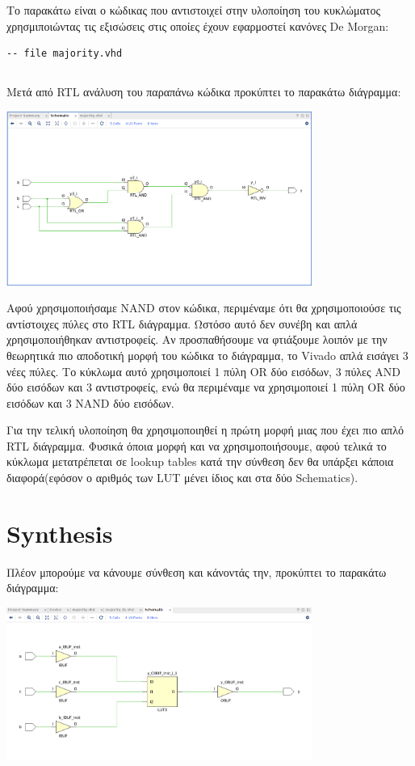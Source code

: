 \documentclass[]{article}
\begin{document}
Το παρακάτω είναι ο κώδικας που αντιστοιχεί στην υλοποίηση του κυκλώματος χρησμιποιώντας τις εξισώσεις στις οποίες έχουν εφαρμοστεί κανόνες De Morgan:
\begin{verbatim}
-- file majority.vhd
\end{verbatim}
\inputminted{vhdl}{./assign_1/majority.vhdl}

Μετά από RTL ανάλυση του παραπάνω κώδικα προκύπτει το παρακάτω διάγραμμα:
\begin{center}
	\includegraphics[width=10cm]{rtl_new.png}
\end{center}

Αφού χρησιμοποιήσαμε NAND στον κώδικα, περιμέναμε ότι θα χρησιμοποιούσε τις αντίστοιχες πύλες στο RTL διάγραμμα.
Ωστόσο αυτό δεν συνέβη και απλά χρησιμοποιήθηκαν αντιστροφείς. Αν προσπαθήσουμε να φτιάξουμε λοιπόν με την θεωρητικά
πιο αποδοτική μορφή του κώδικα το διάγραμμα, το Vivado απλά εισάγει 3 νέες πύλες. Το κύκλωμα αυτό χρησιμοποιεί 1 πύλη OR δύο εισόδων, 3 πύλες AND δύο εισόδων και 3 αντιστροφείς,
ενώ θα περιμέναμε να χρησιμοποιεί 1 πύλη OR δύο εισόδων και 3 NAND δύο εισόδων.

Για την τελική υλοποίηση θα χρησιμοποιηθεί η πρώτη μορφή μιας που έχει πιο απλό RTL διάγραμμα.
Φυσικά όποια μορφή και να χρησιμοποιήσουμε, αφού τελικά το κύκλωμα μετατρέπεται σε lookup tables κατά την σύνθεση δεν θα υπάρξει κάποια διαφορά(εφόσον ο αριθμός των LUT μένει ίδιος και στα δύο Schematics).

\section{Synthesis}
Πλέον μπορούμε να κάνουμε σύνθεση και κάνοντάς την, προκύπτει το παρακάτω διάγραμμα:
\begin{center}
	\includegraphics[width=10cm]{synthesis_schem.png}
\end{center}
\end{document}
